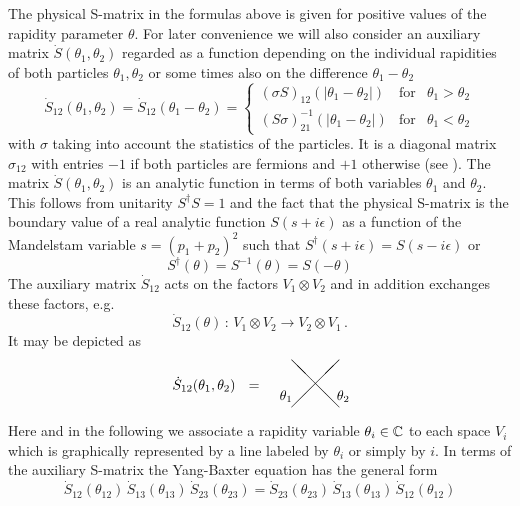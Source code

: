 \documentclass[a4paper,a4paper]{article}
\begin{document}
The physical S-matrix in the formulas above is given for positive values of
the rapidity parameter $\theta $. For later convenience we will also
consider an auxiliary matrix $\dot{S}(\theta _{1},\theta _{2})$ regarded as
a function depending on the individual rapidities of both particles $\theta
_{1},\theta _{2}$ or some times also on the difference $\theta _{1}-\theta
_{2}$%
\[
\dot{S}_{12}(\theta _{1},\theta _{2})=\dot{S}_{12}(\theta _{1}-\theta
_{2})=\left\{ 
\begin{array}{lll}
(\sigma S)_{12}(|\theta _{1}-\theta _{2}|) & \text{for} & \theta _{1}>\theta
_{2} \\ 
(S\sigma )_{21}^{-1}(|\theta _{1}-\theta _{2}|) & \text{for} & \theta
_{1}<\theta _{2}
\end{array}
\right. 
\]
with $\sigma $ taking into account the statistics of the particles. It is a
diagonal matrix $\sigma _{12}$ with entries $-1$ if both particles are
fermions and $+1$ otherwise (see \cite{K1}). The matrix $\dot{S}(\theta
_{1},\theta _{2})$ is an analytic function in terms of both variables $%
\theta _{1}$ and $\theta _{2}$. This follows from unitarity $S^{\dagger }S=1$
and the fact that the physical S-matrix is the boundary value of a real
analytic function $S(s+i\epsilon )$ as a function of the Mandelstam variable 
$s=(p_{1}+p_{2})^{2}$ such that $S^{\dagger }(s+i\epsilon )=S(s-i\epsilon )$
or 
\begin{equation}
S^{\dagger }(\theta )=S^{-1}(\theta )=S(-\theta )  \label{1.65}
\end{equation}
The auxiliary matrix $\dot{S}_{12}$ acts on the factors $V_{1}\otimes V_{2}$
and in addition exchanges these factors, e.g. 
\[
\dot{S}_{12}(\theta )\,:\,V_{1}\otimes V_{2}\to V_{2}\otimes V_{1}\,. 
\]
It may be depicted as 
\[
\dot{S}_{12}(\theta _{1},\theta _{2})~~=~~ 
\begin{array}{c}
\unitlength3mm\begin{picture}(5,4) \put(1,0){\line(1,1){4}}
\put(5,0){\line(-1,1){4}} \put(0,.6){$\theta_1$} \put(4.8,.6){$\theta_2$}
\end{picture}
\end{array}
\]
Here and in the following we associate a rapidity variable $\theta _{i}\in 
\Bbb{C}$ to each space $V_{i}$ which is graphically represented by a line
labeled by $\theta _{i}$ or simply by $i$. In terms of the auxiliary
S-matrix the Yang-Baxter equation has the general form 
\begin{equation}
\dot{S}_{12}(\theta _{12})\,\dot{S}_{13}(\theta _{13})\,\dot{S}_{23}(\theta
_{23})=\dot{S}_{23}(\theta _{23})\,\dot{S}_{13}(\theta _{13})\,\dot{S}%
_{12}(\theta _{12})  \label{1.68}
\end{equation}
\end{document}
